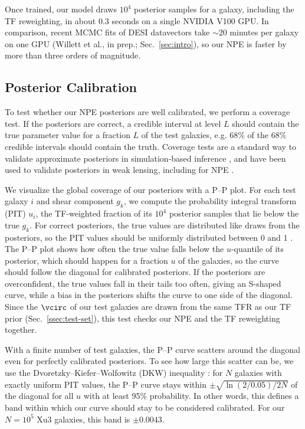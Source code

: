 Once trained, our model draws $10^4$ posterior samples for a galaxy, including the TF reweighting, in about 0.3 seconds on a single NVIDIA V100 GPU. In comparison, recent MCMC fits of DESI datavectors take $\sim$20 minutes per galaxy on one GPU (Willett et al., in prep.; Sec.~\ref{sec:intro}), so our NPE is faster by more than three orders of magnitude.

\subsection{Posterior Calibration}
\label{ssec:calibration}

To test whether our NPE posteriors are well calibrated, we perform a coverage test. If the posteriors are correct, a credible interval at level $L$ should contain the true parameter value for a fraction $L$ of the test galaxies, e.g. 68\% of the 68\% credible intervals should contain the truth. Coverage tests are a standard way to validate approximate posteriors in simulation-based inference \citep{TrustCrisis}, and have been used to validate posteriors in weak lensing, including for NPE \citep{FieldLevelWL, NPEShear}.

We visualize the global coverage of our posteriors with a P--P plot. For each test galaxy $i$ and shear component $g_k$, we compute the probability integral transform (PIT) $u_i$, the TF-weighted fraction of its $10^4$ posterior samples that lie below the true $g_k$. For correct posteriors, the true values are distributed like draws from the posteriors, so the PIT values should be uniformly distributed between 0 and 1 \citep{CookGelmanRubin06, SBC}. The P--P plot shows how often the true value falls below the $u$-quantile of its posterior, which should happen for a fraction $u$ of the galaxies, so the curve should follow the diagonal for calibrated posteriors. If the posteriors are overconfident, the true values fall in their tails too often, giving an S-shaped curve, while a bias in the posteriors shifts the curve to one side of the diagonal. Since the $\vcirc$ of our test galaxies are drawn from the same TFR as our TF prior (Sec.~\ref{ssec:test-set}), this test checks our NPE and the TF reweighting together.

With a finite number of test galaxies, the P--P curve scatters around the diagonal even for perfectly calibrated posteriors. To see how large this scatter can be, we use the Dvoretzky--Kiefer--Wolfowitz (DKW) inequality \citep{DKW56, Massart90}: for $N$ galaxies with exactly uniform PIT values, the P--P curve stays within $\pm\sqrt{\ln(2/0.05)/2N}$ of the diagonal for all $u$ with at least 95\% probability. In other words, this defines a band within which our curve should stay to be considered calibrated. For our $N=10^5$ Xu3 galaxies, this band is $\pm 0.0043$.

